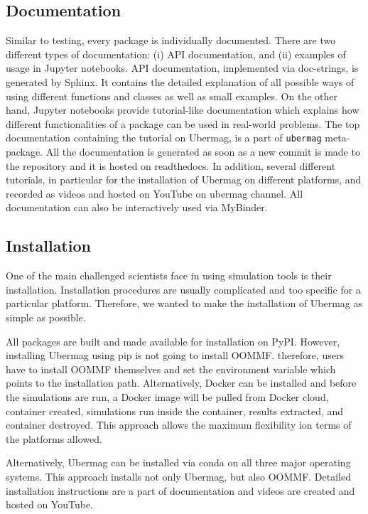 \documentclass{deliverablereport}
\begin{document}
\subsection{Documentation}

Similar to testing, every package is individually documented. There are two different types of documentation: (i) API documentation, and (ii) examples of usage in Jupyter notebooks. API documentation, implemented via doc-strings, is generated by Sphinx. It contains the detailed explanation of all possible ways of using different functions and classes as well as small examples. On the other hand, Jupyter notebooks provide tutorial-like documentation which explains how different functionalities of a package can be used in real-world problems. The top documentation containing the tutorial on Ubermag, is a part of \texttt{ubermag} meta-package. All the documentation is generated as soon as a new commit is made to the repository and it is hosted on readthedocs. In addition, several different tutorials, in particular for the installation of Ubermag on different platforms, and recorded as videos and hosted on YouTube on ubermag channel. All documentation can also be interactively used via MyBinder.

\subsection{Installation}

One of the main challenged scientists face in using simulation tools is their installation. Installation procedures are usually complicated and too specific for a particular platform. Therefore, we wanted to make the installation of Ubermag as simple as possible.

All packages are built and made available for installation on PyPI. However, installing Ubermag using pip is not going to install OOMMF. therefore, users have to install OOMMF themselves and set the environment variable which points to the installation path. Alternatively, Docker can be installed and before the simulations are run, a Docker image will be pulled from Docker cloud, container created, simulations run inside the container, results extracted, and container destroyed. This approach allows the maximum flexibility ion terms of the platforms allowed.

Alternatively, Ubermag can be installed via conda on all three major operating systems. This approach installs not only Ubermag, but also OOMMF. Detailed installation instructions are a part of documentation and videos are created and hosted on YouTube.
\end{document}

